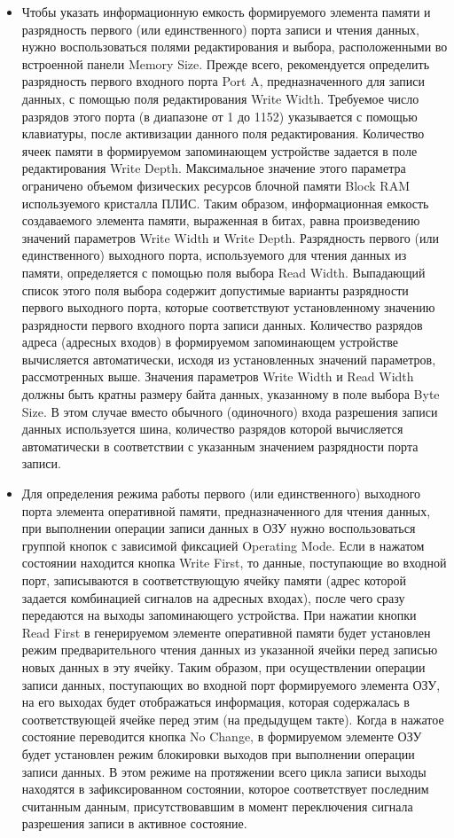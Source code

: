 \begin{itemize}
\item Чтобы указать информационную емкость формируемого элемента памяти и разрядность первого (или единственного) порта записи и чтения данных, нужно воспользоваться полями редактирования и выбора, расположенными во встроенной панели Memory Size. Прежде всего, рекомендуется определить разрядность первого входного порта Port A, предназначенного для записи данных, с помощью поля редактирования Write Width. Требуемое число разрядов этого порта (в диапазоне от 1 до 1152) указывается с помощью клавиатуры, после активизации данного поля редактирования. Количество ячеек памяти в формируемом запоминающем устройстве задается в поле редактирования Write Depth. Максимальное значение этого параметра ограничено объемом физических ресурсов блочной памяти Block RAM используемого кристалла ПЛИС. Таким образом, информационная емкость создаваемого элемента памяти, выраженная в битах, равна произведению значений параметров Write Width и Write Depth. Разрядность первого (или единственного) выходного порта, используемого для чтения данных из памяти, определяется с помощью поля выбора Read Width. Выпадающий список этого поля выбора содержит допустимые варианты разрядности первого выходного порта, которые соответствуют установленному значению разрядности первого входного порта записи данных. Количество разрядов адреса (адресных входов) в формируемом запоминающем устройстве вычисляется автоматически, исходя из установленных значений параметров, рассмотренных выше. Значения параметров Write Width и Read Width должны быть кратны размеру байта данных, указанному в поле выбора Byte Size. В этом случае вместо обычного (одиночного) входа разрешения записи данных используется шина, количество разрядов которой вычисляется автоматически в соответствии с указанным значением разрядности порта записи. 
\item Для определения режима работы первого (или единственного) выходного порта элемента оперативной памяти, предназначенного для чтения данных, при выполнении операции записи данных в ОЗУ нужно воспользоваться группой кнопок с зависимой фиксацией Operating Mode. Если в нажатом состоянии находится кнопка Write First, то данные, поступающие во входной порт, записываются в соответствующую ячейку памяти (адрес которой задается комбинацией сигналов на адресных входах), после чего сразу передаются на выходы запоминающего устройства. При нажатии кнопки Read First в генерируемом элементе оперативной памяти будет установлен режим предварительного чтения данных из указанной ячейки перед записью новых данных в эту ячейку. Таким образом, при осуществлении операции записи данных, поступающих во входной порт формируемого элемента ОЗУ, на его выходах будет отображаться информация, которая содержалась в соответствующей ячейке перед этим (на предыдущем такте). Когда в нажатое состояние переводится кнопка No Change, в формируемом элементе ОЗУ будет установлен режим блокировки выходов при выполнении операции записи данных. В этом режиме на протяжении всего цикла записи выходы находятся в зафиксированном состоянии, которое соответствует последним считанным данным, присутствовавшим в момент переключения сигнала разрешения записи в активное состояние. 

\end{itemize}
